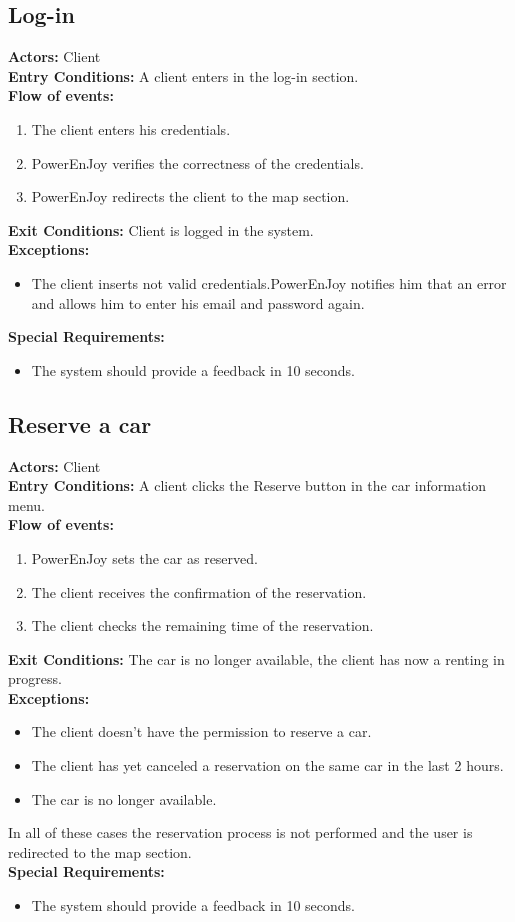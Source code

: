 \subsection{Log-in}
%
\textbf{Actors:}
Client\\
%
\textbf{Entry Conditions:}
A client enters in the log-in section.\\
%
\textbf{Flow of events:}
\begin{enumerate}
\item The client enters his credentials.
\item PowerEnJoy verifies the correctness of the credentials.
\item PowerEnJoy redirects the client to the map section.
\end{enumerate}
%
\textbf{Exit Conditions:}
Client is logged in the system.\\
%
\textbf{Exceptions:}
\begin{itemize}
\item The client inserts not valid credentials.PowerEnJoy notifies him that an error and allows him to enter his email and password again.
\end{itemize}
%
\textbf{Special Requirements:}
\begin{itemize}
\item The system should provide a feedback in 10 seconds.
\end{itemize}


\subsection{Reserve a car}
%
\textbf{Actors:}
Client\\
%
\textbf{Entry Conditions:}
A client clicks the Reserve button in the car information menu.\\
%
\textbf{Flow of events:}
\begin{enumerate}
\item PowerEnJoy sets the car as reserved.
\item The client receives the confirmation of the reservation.
\item The client checks the remaining time of the reservation.  
\end{enumerate}
%
\textbf{Exit Conditions:}
The car is no longer available, the client has now a renting in progress.\\
%
\textbf{Exceptions:}
\begin{itemize}
\item The client doesn't have the permission to reserve a car.
\item The client has yet canceled a reservation on the same car in the last 2 hours. 
\item The car is no longer available.
\end{itemize}
In all of these cases the reservation process is not performed and the user is redirected to the map section. \\
%
\textbf{Special Requirements:}
\begin{itemize}
\item The system should provide a feedback in 10 seconds.
\end{itemize}


